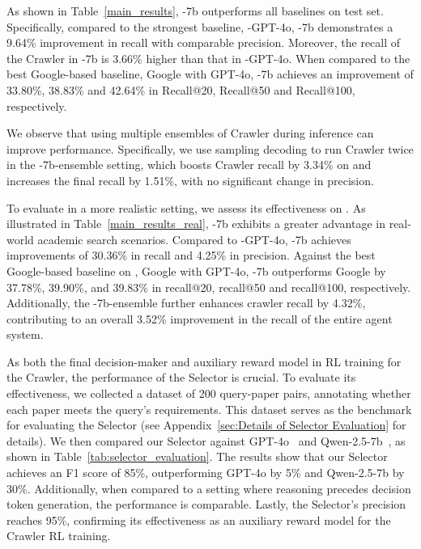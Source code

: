 As shown in Table~\ref{main_results}, \pasa-7b outperforms all baselines on \autoS test set. Specifically, compared to the strongest baseline, \pasa-GPT-4o, \pasa-7b demonstrates a 9.64\% improvement in recall with comparable precision. Moreover, the recall of the Crawler in \pasa-7b is 3.66\% higher than that in \pasa-GPT-4o. When compared to the best Google-based baseline, Google with GPT-4o, \pasa-7b achieves an improvement of 33.80\%, 38.83\% and 42.64\% in Recall@20, Recall@50 and Recall@100, respectively.

We observe that using multiple ensembles of Crawler during inference can improve performance. Specifically, we use sampling decoding to run Crawler twice in the \pasa-7b-ensemble setting, which boosts Crawler recall by 3.34\% on \autoS and increases the final recall by 1.51\%, with no significant change in precision. 

To evaluate \pasa in a more realistic setting, we assess its effectiveness on \realS. As illustrated in Table~\ref{main_results_real}, \pasa-7b exhibits a greater advantage in real-world academic search scenarios. Compared to \pasa-GPT-4o, \pasa-7b achieves improvements of 30.36\% in recall and 4.25\% in precision. Against the best Google-based baseline on \realS, Google with GPT-4o, \pasa-7b outperforms Google by 37.78\%, 39.90\%, and 39.83\% in recall@20, recall@50 and recall@100, respectively. Additionally, the \pasa-7b-ensemble further enhances crawler recall by 4.32\%, contributing to an overall 3.52\% improvement in the recall of the entire agent system.

As both the final decision-maker and auxiliary reward model in RL training for the Crawler, the performance of the Selector is crucial. To evaluate its effectiveness, we collected a dataset of 200 query-paper pairs, annotating whether each paper meets the query's requirements. This dataset serves as the benchmark for evaluating the Selector (see Appendix~\ref{sec:Details of Selector Evaluation} for details). We then compared our Selector against GPT-4o~\cite{hurst2024gpt} and Qwen-2.5-7b~\cite{yang2024qwen2}, as shown in Table~\ref{tab:selector_evaluation}. The results show that our Selector achieves an F1 score of 85\%, outperforming GPT-4o by 5\% and Qwen-2.5-7b by 30\%. Additionally, when compared to a setting where reasoning precedes decision token generation, the performance is comparable. Lastly, the Selector’s precision reaches 95\%, confirming its effectiveness as an auxiliary reward model for the Crawler RL training.

